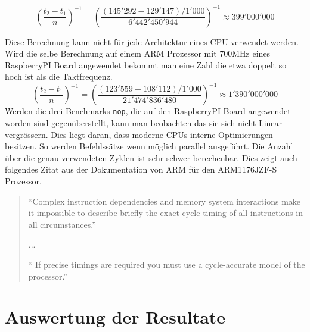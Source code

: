 \[ \left(\frac{t_2-t_1}{n}\right)^{-1} =  \left(\frac{(145'292-129'147)/1'000}{6'442'450'944}\right)^{-1} \approx 399'000'000 \]

Diese Berechnung kann nicht für jede Architektur eines CPU verwendet werden. Wird die selbe Berechnung auf einem ARM Prozessor mit 700MHz eines RaspberryPI Board angewendet bekommt man eine Zahl die etwa doppelt so hoch ist als die Taktfrequenz.
\[ \left(\frac{t_2-t_1}{n}\right)^{-1} =  \left(\frac{(123'559-108'112)/1'000}{21'474'836'480}\right)^{-1} \approx 1'390'000'000 \]
Werden die drei Benchmarks \texttt{nop}, die auf den RaspberryPI Board angewendet worden sind gegenüberstellt, kann man beobachten das sie sich nicht Linear vergrössern. Dies liegt daran, dass moderne CPUs interne Optimierungen besitzen. So werden Befehlssätze wenn möglich parallel ausgeführt. Die Anzahl über die genau verwendeten Zyklen ist sehr schwer berechenbar. Dies zeigt auch folgendes Zitat aus der Dokumentation von ARM für den ARM1176JZF-S Prozessor.

\begin{quotation}
\enquote{Complex instruction dependencies and memory system interactions make it impossible to
describe briefly the exact cycle timing of all instructions in all circumstances.}
\par
...
\par
\enquote{ If precise timings are required you must use a cycle-accurate model of the processor.\cite{arm_datasheet}}
\end{quotation}



\section{Auswertung der Resultate}
\label{sec:auswertung_resultate}

